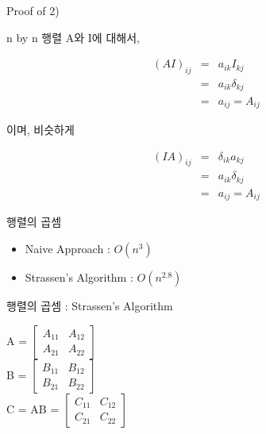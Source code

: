 \documentclass{beamer}
\begin{document}
\begin{frame}{Proof of 2)} 

n by n 행렬 A와 I에 대해서, 

\begin{eqnarray} 
(AI)_{ij} & = & a_{ik} I_{kj} \\
& = & a_{ik}\delta_{kj}  \\
& = & a_{ij} = A_{ij} 
\end{eqnarray}

이며, 비슷하게 

\begin{eqnarray} 
(IA)_{ij} & = & \delta_{ik}a_{kj} \\ 
& = & a_{ik}\delta_{kj}  \\
& = & a_{ij} = A_{ij}
\end{eqnarray}
\end{frame}


\begin{frame}{행렬의 곱셈}

\begin{itemize}
\item Naive Approach : $O(n^3)$
\item Strassen's Algorithm : $O(n^{2.8})$
\end{itemize}
\end{frame}

\begin{frame}{행렬의 곱셈 : Strassen's Algorithm} 

\begin{centering}
A = 
$ \left[ \begin{matrix}
A_{11} & A_{12}  \\
A_{21} & A_{22} 
\end{matrix} \right] $ \\

B = 
$ \left[ \begin{matrix}
B_{11} & B_{12}  \\
B_{21} & B_{22} 
\end{matrix} \right] $ \\

C = AB =  
$ \left[ \begin{matrix}
C_{11} & C_{12}  \\
C_{21} & C_{22} 
\end{matrix} \right] $ \\
\end{centering}

\end{frame}
\end{document}
